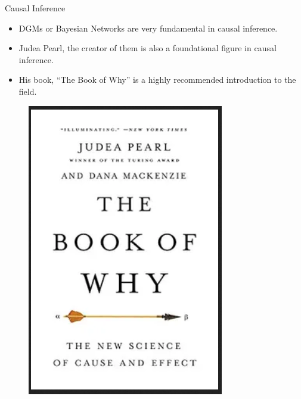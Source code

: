 \documentclass[handout]{beamer}
\begin{document}
\begin{frame}{Causal Inference}
\scriptsize{
\begin{itemize}


\item DGMs or Bayesian Networks are very fundamental in causal inference.

\item Judea Pearl, the creator of them is also a foundational figure in causal inference.

\item His book, ``The Book of Why'' \cite{pearl2018book} is a highly recommended introduction to the field.

\end{itemize}


\begin{figure}[h!]
	\centering
	\includegraphics[scale=0.3]{pics/bookofwhy.png}
	\end{figure} 




} 

\end{frame}
\end{document}

